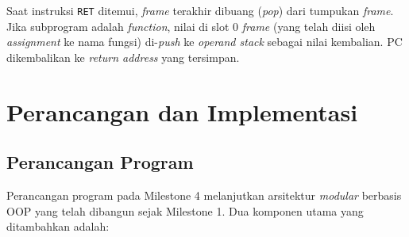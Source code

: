\documentclass[12pt, a4paper]{article}
\begin{document}
Saat instruksi \texttt{RET} ditemui, \textit{frame} terakhir dibuang (\textit{pop}) dari tumpukan \textit{frame}. Jika subprogram adalah \textit{function}, nilai di slot 0 \textit{frame} (yang telah diisi oleh \textit{assignment} ke nama fungsi) di-\textit{push} ke \textit{operand stack} sebagai nilai kembalian. PC dikembalikan ke \textit{return address} yang tersimpan.


\section{Perancangan dan Implementasi}

\subsection{Perancangan Program}
Perancangan program pada Milestone 4 melanjutkan arsitektur \textit{modular} berbasis OOP yang telah dibangun sejak Milestone 1. Dua komponen utama yang ditambahkan adalah:
\end{document}
